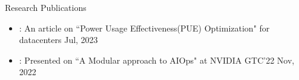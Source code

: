 \documentclass{resume} %
\begin{document}
\begin{rSection}{Research Publications} 
\color{black}
\begin{itemize}[leftmargin=1em,itemsep=-5pt, topsep=-5pt, before={\vspace{-0.5ex}},after=\vspace{-1.5ex},partopsep=0pt]

    \item  \href{https://www.wwt.com/blog/sustainable-data-center-power-usage-effectiveness-estimation-and-optimization}{\textbf{\color{red}{WWT R\&D}}}: \begingroup
					\spaceskip=3pt
					 An article on ``Power Usage Effectiveness(PUE) Optimization" for datacenters {\hfill Jul, 2023}
					\endgroup
	\item 	 \href{https://www.wwt.com/wwt-research/a-modular-approach-to-aiops}{\textbf{\color{red}{WWT R\&D}}}: Presented on ``A Modular approach to AIOps" at NVIDIA GTC'22  {\hfill Nov, 2022}


\end{itemize}
\end{rSection}
\end{document}
